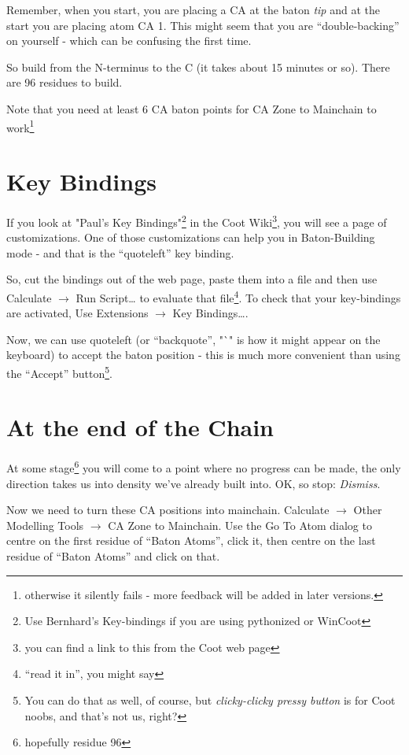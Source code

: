 \documentclass{article}
\begin{document}
Remember, when you start, you are placing a CA at the baton
\emph{tip} and at the start you are placing atom CA 1.  This might
seem that you are ``double-backing'' on yourself - which can be
confusing the first time.

So build from the N-terminus to the C (it takes about 15 minutes or
so).  There are 96 residues to build.

Note that you need at least 6 CA baton points for CA Zone to Mainchain
to work\footnote{otherwise it silently fails - more feedback will be
  added in later versions.}

\section{Key Bindings}

If you look at "Paul's Key Bindings"\footnote{Use Bernhard's
  Key-bindings if you are using pythonized or WinCoot} in
the Coot Wiki\footnote{you can find a link to this from the Coot web
  page}, you will see a page of customizations.  One of those
customizations can help you in Baton-Building mode - and that is the
``quoteleft'' key binding.

So, cut the bindings out of the web page, paste them into a file and
then use \textsf{Calculate $\rightarrow$ Run Script\ldots} to evaluate
that file\footnote{``read it in'', you might say}.  To check that your
key-bindings are activated, Use \textsf{Extensions $\rightarrow$ Key
  Bindings\ldots}.

Now, we can use quoteleft (or ``backquote'', "`" is how it might
appear on the keyboard) to accept the baton position - this is much
more convenient than using the ``Accept'' button\footnote{You can do
  that as well, of course, but \emph{clicky-clicky pressy button} is for
Coot noobs, and that's not us, right?}.


\section{At the end of the Chain} 

At some stage\footnote{hopefully residue 96} you will come to a point
where no progress can be made, the only direction takes us into
density we've already built into.  OK, so stop: \textsl{Dismiss}.

Now we need to turn these CA positions into mainchain.
\textsf{Calculate $\rightarrow$ Other Modelling Tools $\rightarrow$ CA
  Zone to Mainchain}.  Use the \textsf{Go To Atom} dialog to centre on the
first residue of ``Baton Atoms'', click it, then centre on the last
residue of ``Baton Atoms'' and click on that.
\end{document}
